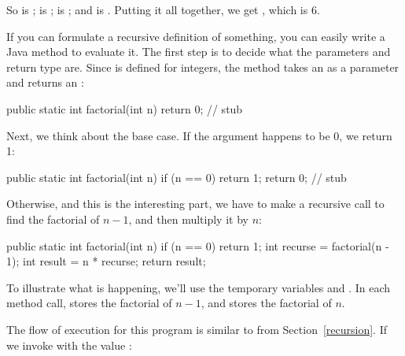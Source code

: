 So  is ;  is ;  is ; and  is .
Putting it all together, we get , which is 6.

If you can formulate a recursive definition of something, you can easily write a Java method to evaluate it.
The first step is to decide what the parameters and return type are.
Since  is defined for integers, the method takes an  as a parameter and returns an :

\begin{code}
public static int factorial(int n) {
    return 0;  // stub
}
\end{code}

Next, we think about the base case.
If the argument happens to be 0, we return 1:

\begin{code}
public static int factorial(int n) {
    if (n == 0) {
        return 1;
    }
    return 0;  // stub
}
\end{code}

Otherwise, and this is the interesting part, we have to make a recursive call to find the factorial of $n-1$, and then multiply it by $n$:

\begin{code}
public static int factorial(int n) {
    if (n == 0) {
        return 1;
    }
    int recurse = factorial(n - 1);
    int result = n * recurse;
    return result;
}
\end{code}

To illustrate what is happening, we'll use the temporary variables  and .
In each method call,  stores the factorial of $n - 1$, and  stores the factorial of $n$.

The flow of execution for this program is similar to  from Section~\ref{recursion}.
If we invoke  with the value :

